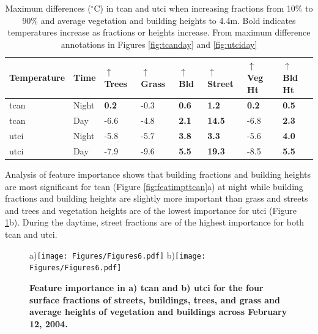 \documentclass[final,3p,times,authoryear]{elsarticle}
\begin{document}
\begin{table}
\begin{tabular}{l l l l l l l l }
\hline
Temperature & Time & 
	$\uparrow$ Trees & 
	$\uparrow$ Grass & 
	$\uparrow$ Bld &
	$\uparrow$ Street &
	$\uparrow$ Veg Ht & 				
	$\uparrow$ Bld Ht 						
	\\
\hline
\gls{tcan} & Night &   
\textbf{0.2}&       %
-0.3& 				%
\textbf{0.6}&       %
\textbf{1.2} &       %
\textbf{0.2}&       %
\textbf{0.5}		%
\\
\gls{tcan} & Day &
-6.6&    	    %
-4.8&           %
\textbf{2.1}&   %
\textbf{14.5}&	%
-6.8&    	 	%
\textbf{2.3}   %
\\
\gls{utci} & Night &   
-5.8&         %
-5.7&         %
\textbf{3.8}& %
\textbf{3.3}&  %
-5.6&         %
\textbf{4.0}   %
\\
\gls{utci} & Day &	
-7.9&           %
-9.6&           %
\textbf{5.5}&   %
\textbf{19.3}&   %
-8.5&           %
\textbf{5.5}  %
\\
\end{tabular}
\caption{\label{tab:tempDiffs}Maximum differences ($^{\circ}$C) in \gls{tcan} and \gls{utci} when increasing fractions from 10\% to 90\% and average vegetation and building heights to 4.4m. Bold indicates temperatures increase as fractions or heights increase. From maximum difference annotations in Figures \ref{fig:tcanday} and \ref{fig:utciday}}
\end{table}

Analysis of feature importance shows that building fractions and building heights are most significant for \gls{tcan} (Figure \ref{fig:featimpttcan}a) at night while building fractions and building heights are slightly more important than grass and streets and trees and vegetation heights are of the lowest importance for \gls{utci} (Figure  \ref{fig:featimptutci}b). During the daytime, street fractions are of the highest importance for both \gls{tcan} and \gls{utci}.

\begin{figure}
\centering
{\tiny a)}\texttt{[image: Figures/Figures6.pdf]}
{\tiny b)}\texttt{[image: Figures/Figures6.pdf]}\\
\caption{\bf Feature importance in a) \gls{tcan} and b) \gls{utci} for the four surface fractions of streets, buildings, trees, and grass and average heights of vegetation and buildings across February 12, 2004.}
\label{fig:featimpttcan}
\label{fig:featimptutci}
\end{figure}
\end{document}
